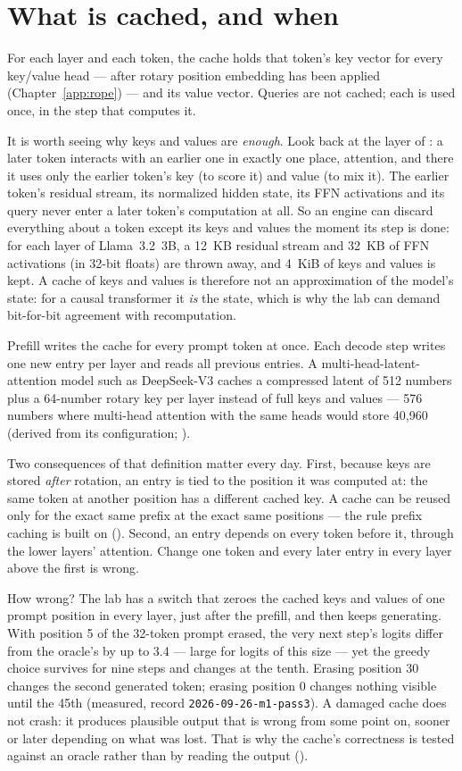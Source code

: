 \section{What is cached, and when}

For each layer and each token, the cache holds that token's key vector for
every key/value head --- after rotary position embedding has been applied
(Chapter~\ref{app:rope}) --- and its value vector. Queries are not cached; each is
used once, in the step that computes it.

It is worth seeing why keys and values are \emph{enough}. Look back at the layer
of : a later token interacts with an earlier one in exactly
one place, attention, and there it uses only the earlier token's key (to score
it) and value (to mix it). The earlier token's residual stream, its normalized
hidden state, its FFN activations and its query never enter a later token's
computation at all. So an engine can discard everything about a token except its
keys and values the moment its step is done: for each layer of Llama~3.2~3B, a
12~KB residual stream and 32~KB of FFN activations (in 32-bit floats) are thrown
away, and 4~KiB of keys and values is kept. A
cache of keys and values is therefore not an approximation of the model's state:
for a causal transformer it \emph{is} the state, which is why the lab can demand
bit-for-bit agreement with recomputation.

Prefill writes the cache for every prompt token at once. Each decode step
writes one new entry per layer and reads all previous entries. A
multi-head-latent-attention model such as DeepSeek-V3 caches a compressed
latent of 512 numbers plus a 64-number rotary key per layer instead of full
keys and values --- 576 numbers where multi-head attention with the same heads
would store 40,960 (derived from its configuration; ).

Two consequences of that definition matter every day. First, because keys are
stored \emph{after} rotation, an entry is tied to the position it was computed
at: the same token at another position has a different cached key. A cache can
be reused only for the exact same prefix at the exact same positions --- the
rule prefix caching is built on (). Second, an entry
depends on every token before it, through the lower layers' attention. Change
one token and every later entry in every layer above the first is wrong.

How wrong? The lab has a switch that zeroes the cached keys and values of one
prompt position in every layer, just after the prefill, and then keeps
generating. With position 5 of the 32-token prompt erased, the very next step's
logits differ from the oracle's by up to 3.4 --- large for logits of this size
--- yet the greedy choice survives for nine steps and changes at the tenth.
Erasing position 30 changes the second generated token; erasing position 0
changes nothing visible until the 45th (measured, record
\texttt{2026-09-26-m1-pass3}). A damaged cache does not crash: it produces
plausible output that is wrong from some point on, sooner or later depending on
what was lost. That is why the cache's correctness is tested against an oracle
rather than by reading the output ().

